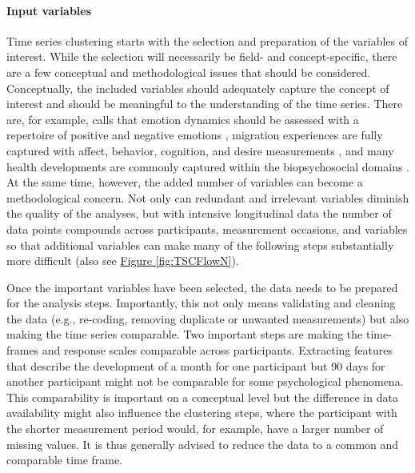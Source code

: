 \documentclass[man, 12pt, a4paper, mask]{apa7}
\theoremstyle{break}
\theoremstyle{plain}
\newcommand{\fgrref}[2][]{\hyperref[#2]{Figure \ref*{#2}#1}}
\begin{document}
\paragraph{Input variables}
Time series clustering starts with the selection and preparation of the variables of interest. While the selection will necessarily be field- and concept-specific, there are a few conceptual and methodological issues that should be considered. Conceptually, the included variables should adequately capture the concept of interest and should be meaningful to the understanding of the time series. There are, for example, calls that emotion dynamics should be assessed with a repertoire of positive and negative emotions \citep[e.g.,][]{dejonckheere2019}, migration experiences are fully captured with affect, behavior, cognition, and desire measurements \citep[e.g.,][]{Kreienkamp2022d}, and many health developments are commonly captured within the biopsychosocial domains \citep[e.g.,][]{suls2004}. At the same time, however, the added number of variables can become a methodological concern. Not only can redundant and irrelevant variables diminish the quality of the analyses, but with intensive longitudinal data the number of data points compounds across participants, measurement occasions, and variables so that additional variables can make many of the following steps substantially more difficult (also see \fgrref{fig:TSCFlowN}). 

Once the important variables have been selected, the data needs to be prepared for the analysis steps. Importantly, this not only means validating and cleaning the data (e.g., re-coding, removing duplicate or unwanted measurements) but also making the time series comparable. Two important steps are making the time-frames and response scales comparable across participants. Extracting features that describe the development of a month for one participant but 90 days for another participant might not be comparable for some psychological phenomena. This comparability is important on a conceptual level but the difference in data availability might also influence the clustering steps, where the participant with the shorter measurement period would, for example, have a larger number of missing values. It is thus generally advised to reduce the data to a common and comparable time frame. 
\end{document}
